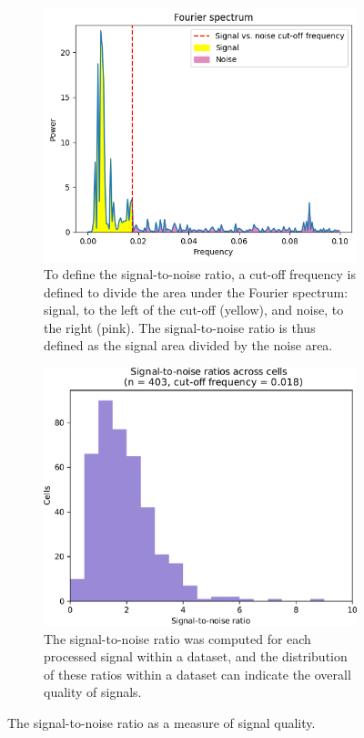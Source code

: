 \begin{figure}
  \centering
  \begin{subfigure}[htpb]{0.8\textwidth}
   \centering
   \includegraphics[width=\textwidth]{snr_illustration}
   \caption{
     To define the signal-to-noise ratio, a cut-off frequency is defined to divide the area under the Fourier spectrum: signal, to the left of the cut-off (yellow), and noise, to the right (pink).
     The signal-to-noise ratio is thus defined as the signal area divided by the noise area.
   }
   \label{fig:analysis-snr-illustration}
  \end{subfigure}
  \begin{subfigure}[htpb]{0.8\textwidth}
   \centering
   \includegraphics[width=\textwidth]{pyruvate_snr_edit}
   \caption{
     The signal-to-noise ratio was computed for each processed signal within a dataset, and the distribution of these ratios within a dataset can indicate the overall quality of signals.
   }
   \label{fig:analysis-snr-histogram-example}
  \end{subfigure}
  \caption{
    The signal-to-noise ratio as a measure of signal quality.
  }
  \label{fig:analysis-snr}
\end{figure}

